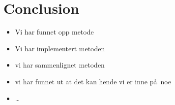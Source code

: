 \chapter{Conclusion}
\label{chapter:conclusion}
\begin{itemize}
  \item Vi har funnet opp metode
  \item Vi har implementert metoden
  \item vi har sammenlignet metoden
  \item vi har funnet ut at det kan hende vi er inne p\aa~noe
  \item \ldots
\end{itemize}